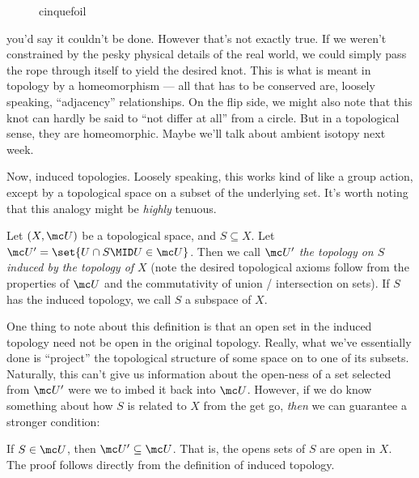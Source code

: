 \documentclass{fkbook}
\theoremstyle{snazzydefinition}
\begin{document}
\begin{adjustwidth}{1em}{1em}
\begin{figure}[H]
\begin{tikzpicture}
    \end{tikzpicture}
    \caption{cinquefoil}
  \end{figure}
  you'd say it couldn't be done. However that's not exactly true. If
  we weren't constrained by the pesky physical details of the real
  world, we could simply pass the rope through itself to yield the
  desired knot. This is what is meant in topology by a homeomorphism
  --- all that has to be conserved are, loosely speaking,
  ``adjacency'' relationships. On the flip side, we might also note
  that this knot can hardly be said to ``not differ at all'' from a
  circle. But in a topological sense, they are homeomorphic. Maybe
  we'll talk about ambient isotopy next week.

  Now, induced topologies. Loosely speaking, this works kind of like a
  group action, except by a topological space on a subset of the
  underlying set. It's worth noting that this analogy might be
  \emph{highly} tenuous.
  \begin{definition}
    Let $(X, \mc U)$ be a topological space, and $S \subseteq X$. Let
    $\mc U' = \set{U \cap S \MID U \in \mc U}$. Then we call $\mc U'$
    \emph{the topology on $S$ induced by the topology of $X$} (note
    the desired topological axioms follow from the properties of $\mc
    U$ and the commutativity of union / intersection on sets). If $S$
    has the induced topology, we call $S$ a subspace of $X$.
  \end{definition}
  One thing to note about this definition is that an open set in the
  induced topology need not be open in the original topology. Really,
  what we've essentially done is ``project'' the topological structure
  of some space on to one of its subsets. Naturally, this can't give
  us information about the open-ness of a set selected from $\mc U'$
  were we to imbed it back into $\mc U$. However, if we do know
  something about how $S$ is related to $X$ from the get go,
  \emph{then} we can guarantee a stronger condition:
  \begin{theorem}
    If $S \in \mc U$, then $\mc U' \subseteq \mc U$. That is, the
    opens sets of $S$ are open in $X$. The proof follows directly from
    the definition of induced topology.
  \end{theorem}

\end{adjustwidth}
\end{document}
